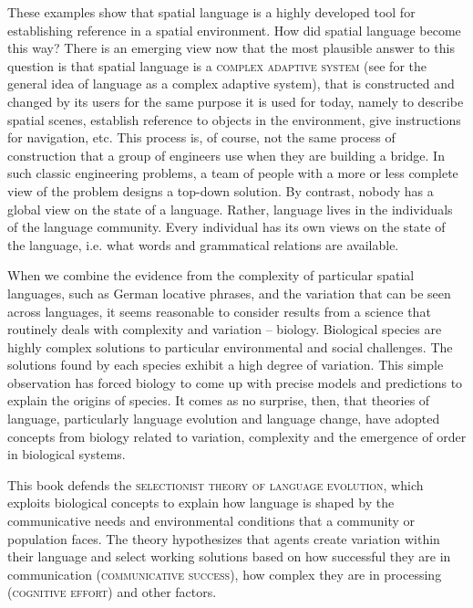 These examples show that spatial language is a highly developed tool for 
establishing reference in a spatial environment. How did spatial language 
become this way? There is an emerging view now that the most plausible answer 
to this question is that spatial language is a \textsc{complex adaptive system}
(see \citealt{steels2000language} for the general idea of language as a complex adaptive system), 
that is constructed and changed by its users for the same purpose it is used for today, 
namely to describe spatial scenes,
establish reference to objects in the environment, give instructions for navigation, etc.
This process is, of course, not the same process of construction that a group
of engineers use when they are building a bridge. In such classic engineering
problems, a team of people with a more or less complete view of the problem
designs a top-down solution. By contrast, nobody has a global view on the state 
of a language. Rather, language lives in the individuals of 
the language community. Every individual has 
its own views on the state of the language, i.e. what words and 
grammatical relations are available.

When we combine the evidence from the complexity of particular spatial languages,
such as German locative phrases, and the variation that can be seen across 
languages, it seems reasonable to consider results from a science 
that routinely deals with complexity and variation -- biology. Biological species are highly 
complex solutions to particular environmental and social challenges. The solutions
found by each species exhibit a high degree of variation. This simple observation has
forced biology to come up with precise models and predictions to explain the 
origins of species. It comes as no surprise, then, that theories of language, particularly 
language evolution and language change, have adopted concepts 
from biology related to variation, complexity and the emergence of order 
in biological systems.  

This book defends the \textsc{selectionist theory of language evolution},
which exploits biological concepts to explain how language is shaped 
by the communicative needs and environmental conditions that a 
community or population faces. 
The theory hypothesizes that agents create variation within their language 
and select working solutions based on how successful they are 
in communication (\textsc{communicative success}), 
how complex they are in processing (\textsc{cognitive effort}) and 
other factors. 

